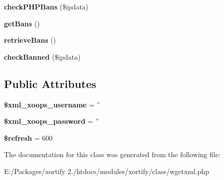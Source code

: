 \begin{DoxyCompactItemize}
\item 
\hypertarget{class_w_g_e_t_x_m_l_xortify_exchange_af9bc3eac0af877460b904b349937393f}{{\bfseries check\-P\-H\-P\-Bans} (\$ipdata)}\label{class_w_g_e_t_x_m_l_xortify_exchange_af9bc3eac0af877460b904b349937393f}

\item 
\hypertarget{class_w_g_e_t_x_m_l_xortify_exchange_a8785d899cea50a25b5e1ca7e5edab10b}{{\bfseries get\-Bans} ()}\label{class_w_g_e_t_x_m_l_xortify_exchange_a8785d899cea50a25b5e1ca7e5edab10b}

\item 
\hypertarget{class_w_g_e_t_x_m_l_xortify_exchange_a4d18d90a0c51d323692dfaa06e6028c1}{{\bfseries retrieve\-Bans} ()}\label{class_w_g_e_t_x_m_l_xortify_exchange_a4d18d90a0c51d323692dfaa06e6028c1}

\item 
\hypertarget{class_w_g_e_t_x_m_l_xortify_exchange_adbe850940c3a39d0ba5a6daa0044d5ba}{{\bfseries check\-Banned} (\$ipdata)}\label{class_w_g_e_t_x_m_l_xortify_exchange_adbe850940c3a39d0ba5a6daa0044d5ba}

\end{DoxyCompactItemize}
\subsection*{Public Attributes}
\begin{DoxyCompactItemize}
\item 
\hypertarget{class_w_g_e_t_x_m_l_xortify_exchange_a0436d97e7943301c96b981385da1ac17}{{\bfseries \$xml\-\_\-xoops\-\_\-username} = ''}\label{class_w_g_e_t_x_m_l_xortify_exchange_a0436d97e7943301c96b981385da1ac17}

\item 
\hypertarget{class_w_g_e_t_x_m_l_xortify_exchange_ab67703d109f911779a6d48be0bcdee97}{{\bfseries \$xml\-\_\-xoops\-\_\-password} = ''}\label{class_w_g_e_t_x_m_l_xortify_exchange_ab67703d109f911779a6d48be0bcdee97}

\item 
\hypertarget{class_w_g_e_t_x_m_l_xortify_exchange_a518c865f67a88fe99996319119585cf8}{{\bfseries \$refresh} = 600}\label{class_w_g_e_t_x_m_l_xortify_exchange_a518c865f67a88fe99996319119585cf8}

\end{DoxyCompactItemize}


The documentation for this class was generated from the following file\-:\begin{DoxyCompactItemize}
\item 
E\-:/\-Packages/xortify 2./htdocs/modules/xortify/class/wgetxml.\-php\end{DoxyCompactItemize}
